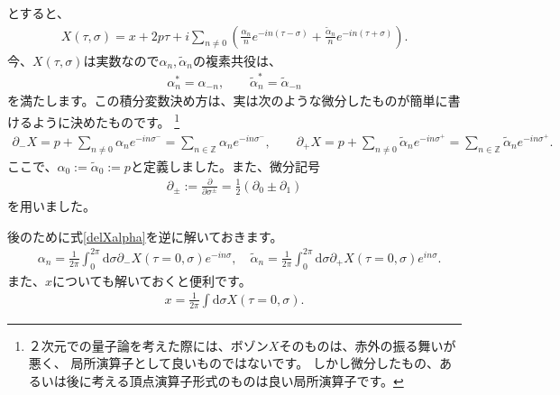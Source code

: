 \documentclass[report,paper=a4, fontsize=12pt, line_length=16cm, number_of_lines=34,dvipdfmx]{jlreq}
\numberwithin{equation}{chapter}
\numberwithin{equation}{section}
\newcommand{\Zb}{\mathbb{Z}}
\newcommand{\del}{\partial}
\newcommand{\alphat}{\tilde{\alpha}}
\newcommand{\di}{\mathrm{d}}
\begin{document}
とすると、
\begin{align}
X(\tau,\sigma)=x+2p\tau+i\sum_{n\ne 0}\left(
\frac{\alpha_n}{n}e^{-in(\tau-\sigma)}
+\frac{\alphat_n}{n}e^{-in(\tau+\sigma)}
\right).
\end{align}
今、$X(\tau,\sigma)$は実数なので$\alpha_n,\alphat_n$の複素共役は、
\begin{align}
\alpha_n^{*}=\alpha_{-n},\qquad
\alphat_n^{*}=\alphat_{-n}
\end{align}
を満たします。この積分変数決め方は、実は次のような微分したものが簡単に書けるように決めたものです。
\footnote{２次元での量子論を考えた際には、ボゾン$X$そのものは、赤外の振る舞いが悪く、
局所演算子として良いものではないです。
しかし微分したもの、あるいは後に考える頂点演算子形式のものは良い局所演算子です。}
\begin{align}
\del_{-}X
=p+\sum_{n\ne 0} \alpha_n e^{-in\sigma^{-}}
=\sum_{n \in \Zb} \alpha_n e^{-in\sigma^{-}}
,\qquad
\del_{+}X
=p+\sum_{n\ne 0} \alphat_n e^{-in\sigma^{+}}
=\sum_{n \in \Zb} \alphat_n e^{-in\sigma^{+}}.
\label{delXalpha}
\end{align}
ここで、$\alpha_0:=\alphat_0:=p$と定義しました。また、微分記号
\begin{align}
\del_{\pm}:=\frac{\del}{\del \sigma^{\pm}} =\frac12 (\del_0 \pm \del_1)
\end{align}
を用いました。

後のために式\eqref{delXalpha}を逆に解いておきます。
\begin{align}
&\alpha_n=\frac{1}{2\pi}\int_0^{2\pi} \di \sigma \del_{-} X(\tau=0,\sigma) e^{-in\sigma}, \quad
\alphat_n=\frac{1}{2\pi}\int_0^{2\pi} \di \sigma \del_{+} X(\tau=0,\sigma) e^{in\sigma}.\label{alphabyX}
\end{align}
また、$x$についても解いておくと便利です。
\begin{align}
x=\frac{1}{2\pi}\int \di\sigma X(\tau=0,\sigma).\label{xbyX}
\end{align}
\end{document}
